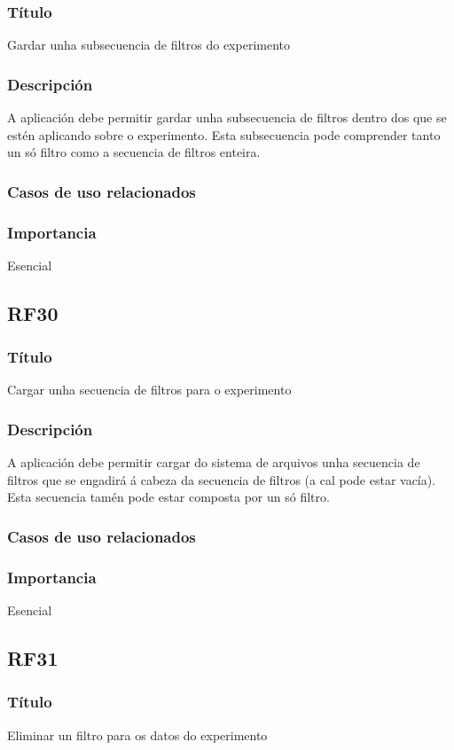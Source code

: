 \subsubsection{Título}
Gardar unha subsecuencia de filtros do experimento
\subsubsection{Descripción}
A aplicación debe permitir gardar unha subsecuencia de filtros dentro dos que se estén aplicando sobre o experimento. Esta subsecuencia pode comprender tanto un só filtro como a secuencia de filtros enteira.
\subsubsection{Casos de uso relacionados}
\subsubsection{Importancia}
Esencial

\subsection*{RF30}
\subsubsection{Título}
Cargar unha secuencia de filtros para o experimento
\subsubsection{Descripción}
A aplicación debe permitir cargar do sistema de arquivos unha secuencia de filtros que se engadirá á cabeza da secuencia de filtros (a cal pode estar vacía). Esta secuencia tamén pode estar composta por un só filtro.
\subsubsection{Casos de uso relacionados}
\subsubsection{Importancia}
Esencial

\subsection*{RF31}
\subsubsection{Título}
Eliminar un filtro para os datos do experimento
